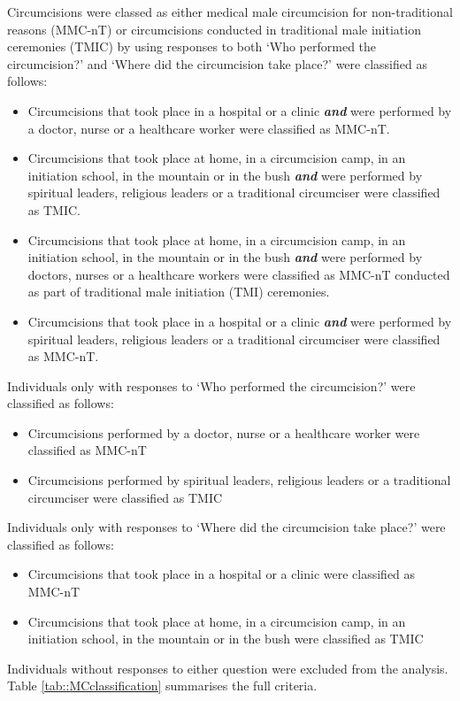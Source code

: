 \documentclass{article}
\begin{document}
\begin{appendix}
\noindent Circumcisions were classed as either medical male circumcision for non-traditional reasons (MMC-nT) or circumcisions conducted in traditional male initiation ceremonies (TMIC) by using responses to both `Who performed the circumcision?' and `Where did the circumcision take place?' were classified as follows:
\begin{itemize}
	\item Circumcisions that took place in a hospital or a clinic \textbf{\textit{and}} were performed by a doctor, nurse or a healthcare worker were classified as MMC-nT.
	\item Circumcisions that took place at home, in a circumcision camp, in an initiation school, in the mountain or in the bush \textbf{\textit{and}} were performed by spiritual leaders, religious leaders or a traditional circumciser were classified as TMIC.
	\item Circumcisions that took place at home, in a circumcision camp, in an initiation school, in the mountain or in the bush \textbf{\textit{and}} were performed by doctors, nurses or a healthcare workers were classified as MMC-nT conducted as part of traditional male initiation (TMI) ceremonies.
	\item Circumcisions that took place in a hospital or a clinic \textbf{\textit{and}} were performed by spiritual leaders, religious leaders or a traditional circumciser were classified as MMC-nT.
\end{itemize}

Individuals only with responses to `Who performed the circumcision?' were classified as follows:
\begin{itemize}
	\item Circumcisions performed by a doctor, nurse or a healthcare worker were classified as MMC-nT
	\item Circumcisions performed by spiritual leaders, religious leaders or a traditional circumciser were classified as TMIC	
\end{itemize}
Individuals only with responses to `Where did the circumcision take place?' were classified as follows:
\begin{itemize}
	\item Circumcisions that took place in a hospital or a clinic were classified as MMC-nT
	\item Circumcisions that took place at home, in a circumcision camp, in an initiation school, in the mountain or in the bush were classified as TMIC	
\end{itemize}
Individuals without responses to either question were excluded from the analysis. Table \ref{tab::MCclassification} summarises the full criteria. 


\end{appendix}
\end{document}
